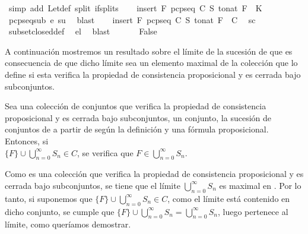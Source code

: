 \begin{isabellebody}
\ {\isacharparenleft}simp\ add{\isacharcolon}\ Let{\isacharunderscore}def\ split{\isacharcolon}\ if{\isacharunderscore}splits{\isacharparenright}\isanewline
\ \ \isamarkupfalse%
\ {\isachardoublequoteopen}insert\ F\ {\isacharparenleft}pcp{\isacharunderscore}seq\ C\ S\ {\isacharparenleft}to{\isacharunderscore}nat\ F{\isacharparenright}{\isacharparenright}\ {\isasymsubseteq}\ K{\isachardoublequoteclose}\ \isamarkupfalse%
\ pcp{\isacharunderscore}seq{\isacharunderscore}sub\ e\ su\ \isamarkupfalse%
\ blast\isanewline
\ \ \isamarkupfalse%
\ {\isachardoublequoteopen}insert\ F\ {\isacharparenleft}pcp{\isacharunderscore}seq\ C\ S\ {\isacharparenleft}to{\isacharunderscore}nat\ F{\isacharparenright}{\isacharparenright}\ {\isasymin}\ C{\isachardoublequoteclose}\ \isamarkupfalse%
\ sc\ \isanewline
\ \ \ \ \isamarkupfalse%
\ subset{\isacharunderscore}closed{\isacharunderscore}def\ \isamarkupfalse%
\ el\ \isamarkupfalse%
\ blast\isanewline
\ \ \isamarkupfalse%
\ {}\ \isamarkupfalse%
\ False\ \isacommand{{\isachardot}{\isachardot}}\isamarkupfalse%
\isanewline
{}\isamarkupfalse%
%
\endisatagproof
{\isafoldproof}%
%
\isadelimproof
%
\endisadelimproof
%
\begin{isamarkuptext}%
A continuación mostremos un resultado sobre el límite de la sucesión de  que es 
  consecuencia de que dicho límite sea un elemento maximal de la colección que lo define si esta
  verifica la propiedad de consistencia proposicional y es cerrada bajo subconjuntos.
  
  \begin{corolario}
    Sea  una colección de conjuntos que verifica la propiedad de consistencia proposicional y
    es cerrada bajo subconjuntos,  un conjunto,  la sucesión de conjuntos de  a partir 
    de  según la definición  y  una fórmula proposicional. Entonces, si\\
    $\{F\} \cup \bigcup_{n = 0}^{\infty} S_{n} \in C$, se verifica que 
    $F \in \bigcup_{n = 0}^{\infty} S_{n}$. 
  \end{corolario}

  \begin{demostracion}
    Como  es una colección que verifica la propiedad de consistencia proposicional y es cerrada 
    bajo subconjuntos, se tiene que el límite $\bigcup_{n = 0}^{\infty} S_{n}$ es maximal en . Por 
    lo tanto, si suponemos que $\{F\} \cup \bigcup_{n = 0}^{\infty} S_{n} \in C$, como el límite 
    está contenido en dicho conjunto, se cumple que 
    $\{F\} \cup \bigcup_{n = 0}^{\infty} S_{n} = \bigcup_{n = 0}^{\infty} S_{n}$, luego  
    pertenece al límite, como queríamos demostrar.
  \end{demostracion}


\end{isamarkuptext}
\end{isabellebody}
